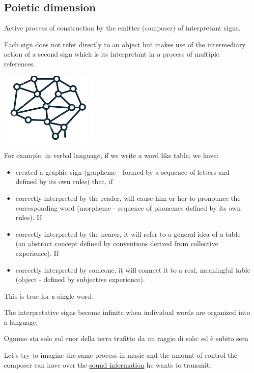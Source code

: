 \subsection{Poietic dimension}\label{poietic-dimension}

Active process of construction by the emitter (composer) of interpretant signs.

Each sign does not refer directly to an object but makes use of the intermediary action of a second sign which is its interpretant in a process of multiple references.

\begin{center}
\includegraphics[scale=0.45]{../img/rimandi.png}
\end{center}

For example, in verbal language, if we write a word like table, we have:

\begin{itemize}
\tightlist
\item created a graphic sign (grapheme - formed by a sequence of letters and defined by its own rules) that, if
\item correctly interpreted by the reader, will cause him or her to pronounce the corresponding word (morpheme - sequence of phonemes defined by its own rules). If
\item correctly interpreted by the hearer, it will refer to a general idea of a table (an abstract concept defined by conventions derived from collective experience). If
\item correctly interpreted by someone, it will connect it to a real, meaningful table (object - defined by subjective experience).
\end{itemize}

This is true for a single word.

The interpretative signs become infinite when individual words are organized into a language.

Ognuno sta solo sul cuor della terra trafitto da un raggio di sole: ed è subito sera

Let's try to imagine the same process in music and the amount of control the composer can have over the \href{http://www.musicaecodice.it/gitmedia/emc/1_media/goldberg.mp3}{sound information} he wants to transmit.

